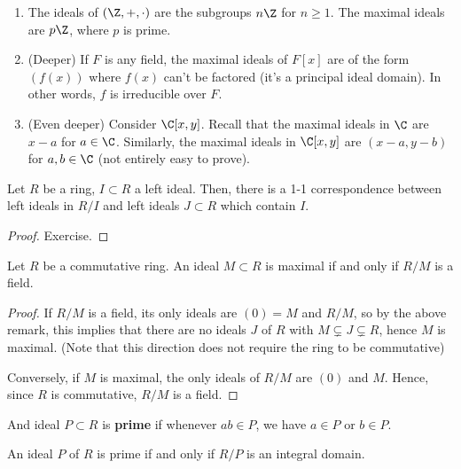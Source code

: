 \begin{ex}
    \begin{enumerate}
        \item The ideals of $(\Z,+,\cdot)$ are the subgroups $n\Z$ for $ n\geq 1$. The maximal ideals are $p\Z$, where $p$ is prime.
        \item (Deeper) If $F$ is any field, the maximal ideals of $F[x]$ are of the form $(f(x))$ where $f(x)$ can't be factored (it's a principal ideal domain). In other words, $f$ is irreducible over $F$.
        \item (Even deeper) Consider $\C[x,y]$. Recall that the maximal ideals in $\C$ are $x-a$ for $a \in \C$. Similarly, the maximal ideals in $\C[x,y]$ are $(x-a,y-b)$ for $a,b \in \C$ (not entirely easy to prove).
    \end{enumerate}
\end{ex}

\begin{rmk}
    Let $R$ be a ring, $I \subset R$ a left ideal. Then, there is a 1-1 correspondence between left ideals in $R/I$ and left ideals $J \subset R$ which contain $I$.
\end{rmk}

\begin{proof}
    Exercise.
\end{proof}

\begin{thm}
    Let $R$ be a commutative ring. An ideal $M \subset R$ is maximal if and only if $R/M$ is a field.
\end{thm}

\begin{proof}
    If $R/M$ is a field, its only ideals are $(0)=M$ and $R/M$, so by the above remark, this implies that there are no ideals $J$ of $R$ with $M \subsetneq J \subsetneq R$, hence $M$ is maximal. (Note that this direction does not require the ring to be commutative)

    Conversely, if $M$ is maximal, the only ideals of $R/M$ are $(0)$ and $M$. Hence, since $R$ is commutative, $R/M$ is  a field.
\end{proof}

\begin{defn}
    And ideal $P \subset R$ is \textbf{prime} if whenever $ab \in P$, we have $a\in P$ or $b \in P$.
\end{defn}

\begin{prop}
    An ideal $P$ of $R$ is prime if and only if $R/P$ is an integral domain.
\end{prop}

